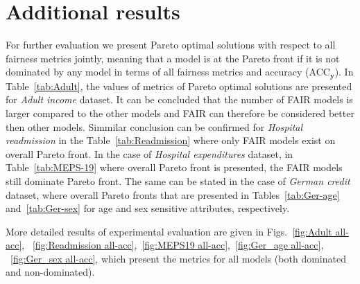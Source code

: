 \documentclass[preprint,12pt]{elsarticle}
\begin{document}
\section{Additional results}
\label{app:Additional_results}

For further evaluation we present Pareto optimal solutions with respect to all fairness metrics jointly, meaning that a model is at the Pareto front if it is not dominated by any model in terms of all fairness metrics and accuracy (ACC$_\mathbf{y}$).
In Table~\ref{tab:Adult}, the values of metrics of Pareto optimal solutions are presented for \textit{Adult income} dataset. It can be concluded that the number of FAIR models is larger compared to the other models and FAIR can therefore be considered better then other models. Simmilar conclusion can be confirmed for \textit{Hospital readmission} in the Table~\ref{tab:Readmission} where only FAIR models exist on overall Pareto front. In the case of \textit{Hospital expenditures} dataset, in Table~\ref{tab:MEPS-19} where overall Pareto front is presented, the FAIR models still dominate Pareto front. The same can be stated in the case of \textit{German credit} dataset, where overall Pareto fronts that are presented in Tables~\ref{tab:Ger-age} and~\ref{tab:Ger-sex} for age and sex sensitive attributes, respectively. 

More detailed results of experimental evaluation are given in Figs.~\ref{fig:Adult all-acc}, ~\ref{fig:Readmission all-acc},~\ref{fig:MEPS19 all-acc},~\ref{fig:Ger_age all-acc}, ~\ref{fig:Ger_sex all-acc}, which present the metrics for all models (both dominated and non-dominated). 
\end{document}

